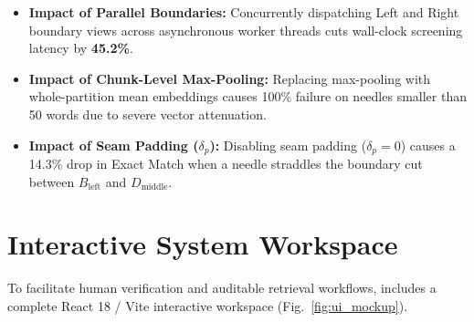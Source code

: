 \begin{itemize}
    \item \textbf{Impact of Parallel Boundaries:} Concurrently dispatching Left and Right boundary views across asynchronous worker threads cuts wall-clock screening latency by \textbf{45.2\%}.
    \item \textbf{Impact of Chunk-Level Max-Pooling:} Replacing max-pooling with whole-partition mean embeddings causes 100\% failure on needles smaller than 50 words due to severe vector attenuation.
    \item \textbf{Impact of Seam Padding ($\delta_p$):} Disabling seam padding ($\delta_p = 0$) causes a 14.3\% drop in Exact Match when a needle straddles the boundary cut between $B_{\text{left}}$ and $D_{\text{middle}}$.
\end{itemize}

\section{Interactive System Workspace}
\label{sec:ui}

To facilitate human verification and auditable retrieval workflows, \RBER{} includes a complete React 18 / Vite interactive workspace (Fig.~\ref{fig:ui_mockup}).

